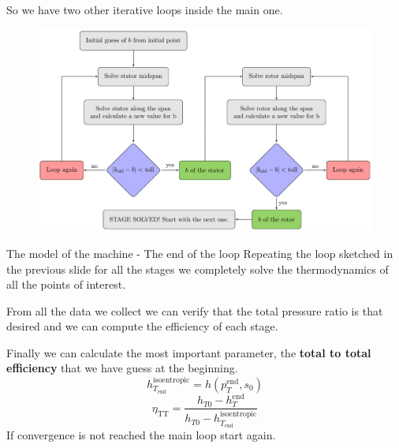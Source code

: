 \documentclass{beamer}
\newcommand{\myspace}[0]{\vspace{0.3cm}}
\newcommand{\highlightgreenC}[1]{\textcolor{chameleongreen3}{#1}}%
\begin{document}
\begin{frame}[t]
So we have two other iterative loops inside the main one.

\begin{figure}[hbtp]
\centering
\includegraphics[scale=0.6]{fig/secondaryloop_fig.pdf}
\end{figure}

\end{frame}


\begin{frame}[t]{The model of the machine - The end of the loop}
Repeating the loop sketched in the previous slide for all the stages we completely solve the thermodynamics of all the points of interest.

From all the data we collect we can verify that the total pressure ratio is that desired and we can compute the efficiency of each stage.

\myspace
Finally we can calculate the most important parameter, the \highlightgreenC{\textbf{total to total efficiency}} that we have guess at the beginning.
\begin{equation}
h_{T_\text{end}}^\text{isoentropic} = h(p_T^\text{end}, s_0)
\end{equation}
\begin{equation}
\eta_{\text{TT}} = \frac{h_{T0} - h_T^{\text{end}}}{h_{T0} - h_{T_{\text{end}}}^{\text{isoentropic}}}
\end{equation}
If convergence is not reached the main loop start again.
\end{frame}
\end{document}
